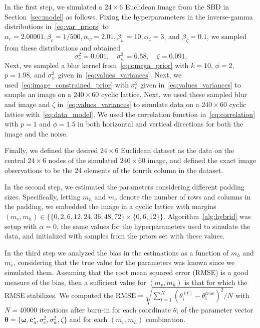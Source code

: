 \documentclass[12pt]{article}
\begin{document}
In the first step, we simulated a $24 \times 6$ Euclidean image from the SBD in Section~\ref{sec:model} as follows. 
Fixing the hyperparameters in the inverse-gamma distributions in~\eqref{eq:var_priors} to $\alpha_c=2.00001, \beta_c=1/500, \alpha_w=2.01, \beta_w=10, \alpha_{\zeta}=3$, and $\beta_{\zeta}=0.1$, we sampled from these distributions and obtained
\begin{equation} \label{eq:values_variances}
    \sigma_c^2=0.001, \quad \sigma_w^2=6.58, \quad \zeta=0.091.
\end{equation}
Next, we sampled a blur kernel from~\eqref{eq:omega_prior} with $k=10$, $\phi=2$, $p=1.98$, and $\sigma_w^2$ given in~\eqref{eq:values_variances}. 
Next, we used~\eqref{eq:image_constrained_prior} with $\sigma_c^2$ given in~\eqref{eq:values_variances} to sample an image on a $240 \times 60$ cyclic lattice. Next, we used these sampled blur and image and $\zeta$ in~\eqref{eq:values_variances} to simulate data on a $240 \times 60$ cyclic lattice with~\eqref{eq:data_model}. 
We used the correlation function in~\ref{eq:correlation} with $p=1$ and $\phi=1.5$ in both horizontal and vertical directions for both the image and the noise. 

Finally, we defined the desired $24 \times 6$ Euclidean dataset as the data on the central $24 \times 6$ nodes of the simulated $240 \times 60$ image, and defined the exact image observations to be the 24 elements of the fourth column in the dataset. 

In the second step, we estimated the parameters considering different padding sizes. Specifically, letting $m_h$ and $m_v$ denote the number of rows and columns in the padding, we embedded the image in a cyclic lattice with margins $(m_v, m_h) \in \{ \{0, 2, 6, 12, 24, 36, 48, 72 \} \times \{0, 6, 12 \}\}$. 
Algorithm~\ref{alg:hybrid} was setup with $\alpha=0$, the same values for the hyperparameters used to simulate the data, and initialized with samples from the priors set with these values.

In the third step we analyzed the bias in the estimations as a function of $m_h$ and $m_v$, considering that the true value for the parameters was known since we simulated them. Assuming that the root mean squared error (RMSE) is a good measure of the bias, then a sufficient value for $(m_v, m_h)$ is that for which the RMSE stabilizes. 
We computed the $\text{RMSE}=\sqrt{\sum_{t=1}^{N}{(\theta_i^{(t)} - \theta_i^{true})^2}/N}$ with $N=40000$  iterations after burn-in for each coordinate $\theta_i$ of the parameter vector $\bm{\theta} = \{\bm{\omega}, \bm{c}_u^{\star}, \sigma_c^2, \sigma_{w}^2, \zeta\}$ and for each $(m_v, m_h)$ combination. 
\end{document}
